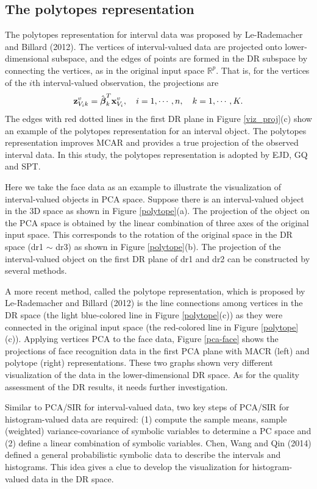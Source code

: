 \documentclass[article]{jss}
\newcommand{\mbf }[1]{\mbox{\boldmath ${#1}$}}
\begin{document}
\subsection{The polytopes representation}
The polytopes representation for interval data was proposed
by Le-Rademacher and Billard (2012). The vertices of
interval-valued data are projected onto
lower-dimensional subspace, and the edges of points are formed
in the DR subspace by connecting the vertices, as
in the original input space $\mathbb{R}^p$. That is, for the
vertices of the $i$th interval-valued observation, the
projections are
\[
{\bf z}_{V_ik}^v= \hat{\mbf \beta}_k^T{\bf x}^v_{V_i}  , \quad i=1,\cdots, n,\quad k=1,\cdots, K.
\]
The edges with red dotted lines in the first DR plane in Figure 
\ref{viz_proj}(c) show an example of the polytopes representation for an 
interval object.
The polytopes representation improves MCAR and provides a true projection of the observed interval data. In this study, the polytopes representation is adopted by EJD, GQ and SPT.

Here we take the face data as an example to illustrate the
visualization of interval-valued objects in PCA space.
Suppose there is an interval-valued object in the 3D space
as shown in Figure \ref{polytope}(a). The projection of the
object on the PCA space is obtained by the linear
combination of three axes of the original input space. This
corresponds to the rotation of the original space in the DR
space (dr1 $\sim$ dr3) as shown in Figure
\ref{polytope}(b). The projection of the interval-valued
object on the first DR plane of dr1 and dr2 can be
constructed by several methods. 

A more recent method, called the polytope
representation, which is proposed by Le-Rademacher and
Billard (2012) is the line connections among vertices in
the DR space (the light blue-colored line in Figure
\ref{polytope}(c)) as they were connected in the original
input space (the red-colored line in Figure
\ref{polytope}(c)). Applying vertices PCA to the face data,
Figure \ref{pca-face} shows the projections of face
recognition data in the first PCA plane with MACR (left)
and polytope (right) representations. These two graphs
shown very different visualization of the data in the
lower-dimensional DR space. As for the quality assessment
of the DR results, it needs further investigation.


Similar to PCA/SIR for interval-valued data, two key steps
of PCA/SIR for histogram-valued data are required: (1)
compute the sample means, sample (weighted)
variance-covariance of symbolic variables to determine a PC
space and (2) define a linear combination of symbolic
variables. Chen, Wang and Qin (2014) defined a general
probabilistic symbolic data to describe the intervals and
histograms. This idea gives a clue to develop the
visualization for histogram-valued data in the DR space.
\end{document}
